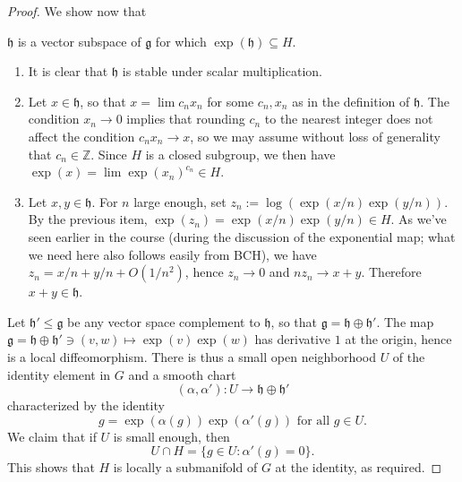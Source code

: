 \documentclass[reqno]{amsart} 
\begin{document}
\begin{proof}
  We show now that
  \begin{center}
    $\mathfrak{h}$ is a vector subspace of $\mathfrak{g}$ for which $\exp(\mathfrak{h}) \subseteq H$.
  \end{center}
  \begin{enumerate}
  \item It is clear that $\mathfrak{h}$ is stable under scalar multiplication.
  \item Let $x \in \mathfrak{h}$, so that $x = \lim c_n x_n$ for some $c_n, x_n$ as in the definition of $\mathfrak{h}$.  The condition $x_n \rightarrow 0$ implies that rounding $c_n$ to the nearest integer does not affect the condition $c_n x_n \rightarrow x$, so we may assume without loss of generality that $c_n \in \mathbb{Z}$.  Since $H$ is a closed subgroup, we then have $\exp (x) = \lim \exp(x_n)^{c_n} \in H$.
  \item Let $x,y \in \mathfrak{h}$.  For $n$ large enough, set $z_n := \log(\exp(x/n) \exp(y/n))$.  By the previous item, $\exp(z_n) = \exp(x/n) \exp(y/n) \in H$.  As we've seen earlier in the course (during the discussion of the exponential map; what we need here also follows easily from BCH), we have $z_n = x/n + y/n + O(1/n^2)$,
    hence $z_n \rightarrow 0$ and $n z_n \rightarrow x + y$.  Therefore $x + y \in \mathfrak{h}$.
  \end{enumerate}

  Let $\mathfrak{h} ' \leq \mathfrak{g}$ be any vector space complement to $\mathfrak{h}$, so that $\mathfrak{g} = \mathfrak{h} \oplus \mathfrak{h} '$.  The map $\mathfrak{g} = \mathfrak{h} \oplus \mathfrak{h} ' \ni (v,w) \mapsto \exp(v) \exp(w)$ has derivative $1$ at the origin, hence is a local diffeomorphism.  There is thus a small open neighborhood $U$ of the identity element in $G$ and a smooth chart
  \begin{equation*}
    (\alpha,\alpha ' ) : U \rightarrow \mathfrak{h} \oplus \mathfrak{h}'
  \end{equation*}
  characterized by the identity
  \begin{equation*}
g = \exp(\alpha(g)) \exp(\alpha'(g)) \text{ for all }g \in U.
\end{equation*}
 We claim that if $U$ is small enough, then
  \begin{equation*}
U \cap H = \{g \in U : \alpha'(g) = 0\}.
\end{equation*}
 This shows that $H$ is locally a submanifold of $G$ at the identity, as required.


\end{proof}
\end{document}
